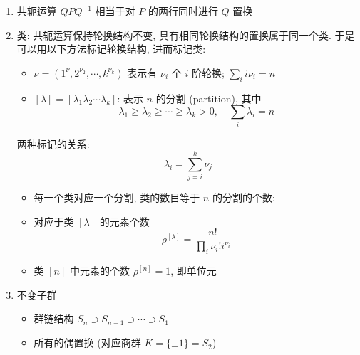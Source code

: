 \documentclass[12pt,a4paper]{article}%
\numberwithin{equation}{section}%
\begin{document}
\begin{enumerate}
	\item 共轭运算 $QPQ^{-1}$ 相当于对 $P$ 的两行同时进行 $Q$ 置换
	\item 类: 共轭运算保持轮换结构不变, 具有相同轮换结构的置换属于同一个类. 于是可以用以下方法标记轮换结构, 进而标记类: 
	\begin{itemize}
		\item $\nu = (1^{\nu}, 2^{\nu_2}, \cdots, k^{\nu_k})$ 表示有 $\nu_i$ 个 $i$ 阶轮换; $\sum_i i\nu_i = n$
		\item $[\lambda] = [\lambda_1\lambda_2\cdots\lambda_k]$: 表示 $n$ 的分割 (partition), 其中
		\begin{equation}
			\lambda_1 \ge \lambda_2 \ge \cdots \ge \lambda_k > 0, \quad 
			\sum_i \lambda_i = n
		\end{equation}
	\end{itemize}
	两种标记的关系: 
	\begin{equation}
		\lambda_i = \sum_{j=i}^k\nu_j
	\end{equation}
	\begin{itemize}
		\item 每一个类对应一个分割, 类的数目等于 $n$ 的分割的个数; 
		\item 对应于类 $[\lambda]$ 的元素个数
		\begin{equation}
			\rho^{[\lambda]} = \frac{n!}{\prod_i \nu_i!i^{\nu_i}}
		\end{equation}
		\item 类 $[n]$ 中元素的个数 $\rho^{[n]} = 1$, 即单位元
	\end{itemize}
	\item 不变子群
	\begin{itemize}
		\item 群链结构 $S_n\supset S_{n-1}\supset \cdots \supset S_1$
		\item 所有的偶置换 (对应商群 $K = \{\pm1\} = S_2$)
	\end{itemize}
\end{enumerate}
\end{document}
